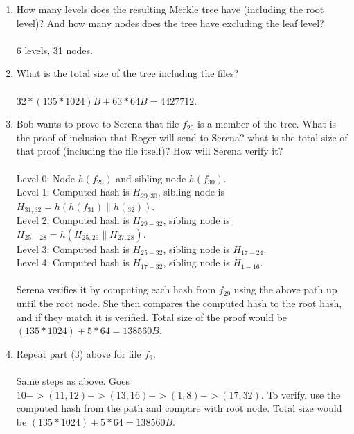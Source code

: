 \documentclass[12pt]{article}
\newcommand*\concat{\mathbin{\|}}
\begin{document}
\begin{enumerate}
    \item How many levels does the resulting Merkle tree have (including the root level)? And how many nodes does the tree have excluding the leaf level?
    \\\\6 levels, 31 nodes.
    \item What is the total size of the tree including the files?
    \\\\$32*(135*1024)B + 63*64B = 4427712$. 
    \item Bob wants to prove to Serena that file $f_{29}$ is a member of the tree. What is the proof of inclusion that Roger will send to Serena? what is the total size of that proof (including the file itself)? How will Serena verify it?
    \\\\Level 0: Node $h(f_{29})$ and sibling node $h(f_{30})$.
    \\Level 1: Computed hash is $H_{29,30}$, sibling node is $H_{31,32} = h(h(f_{31}) \concat h(_{32}))$.
    \\Level 2: Computed hash is $H_{29-32}$, sibling  node is $H_{25-28} = h(H_{25,26} \concat H_{27,28})$.
    \\Level 3: Computed hash is $H_{25-32}$, sibling node is $H_{17-24}$.
    \\Level 4: Computed hash is $H_{17-32}$, sibling node is $H_{1-16}$.
    \\\\Serena verifies it by computing each hash from $f_{29}$ using the above path up until the root node. She then compares the computed hash to the root hash, and if they match it is verified. Total size of the proof would be $(135*1024) + 5*64 = 138560B$.
    \item Repeat part (3) above for file $f_9$.
    \\\\Same steps as above. Goes $10 -> (11,12) -> (13,16) -> (1,8) -> (17,32)$. To verify, use the computed hash from the path and compare with root node. Total size would be $(135*1024) + 5*64 = 138560B$.
\end{enumerate}
\end{document}
